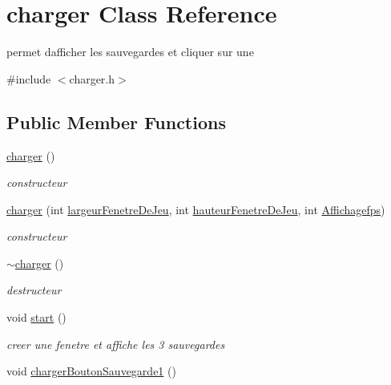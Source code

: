 \hypertarget{classcharger}{}\section{charger Class Reference}
\label{classcharger}


permet d\textquotesingle{}afficher les sauvegardes et cliquer sur une  




{\ttfamily \#include $<$charger.\+h$>$}

\subsection*{Public Member Functions}
\begin{DoxyCompactItemize}
\item 
\mbox{\hyperlink{classcharger_ad1fa3b994691eedb2c210570f5ccd5f3}{charger}} ()
\begin{DoxyCompactList}\small\item\em constructeur \end{DoxyCompactList}\item 
\mbox{\hyperlink{classcharger_a2776f26278d60aef70fffee5b76faabf}{charger}} (int \mbox{\hyperlink{classcharger_a9778bdc90d1404a3b1af81349fbd8c60}{largeur\+Fenetre\+De\+Jeu}}, int \mbox{\hyperlink{classcharger_ae16952f21bfdfdf537575ef898993145}{hauteur\+Fenetre\+De\+Jeu}}, int \mbox{\hyperlink{classcharger_ad6193b2bdf5b389a40406961cd59090f}{Affichagefps}})
\begin{DoxyCompactList}\small\item\em constructeur \end{DoxyCompactList}\item 
\mbox{\hyperlink{classcharger_aa8b0a28880b7cc8e795db7b052659da6}{$\sim$charger}} ()
\begin{DoxyCompactList}\small\item\em destructeur \end{DoxyCompactList}\item 
void \mbox{\hyperlink{classcharger_a8e98fa0fa752226f1bf578b5d01a6319}{start}} ()
\begin{DoxyCompactList}\small\item\em creer une fenetre et affiche les 3 sauvegardes \end{DoxyCompactList}\item 
\mbox{\label{classcharger_abde85cfd32f9917182de0df3f5001208}} 
void \mbox{\hyperlink{classcharger_abde85cfd32f9917182de0df3f5001208}{charger\+Bouton\+Sauvegarde1}} ()

\end{DoxyCompactItemize}
